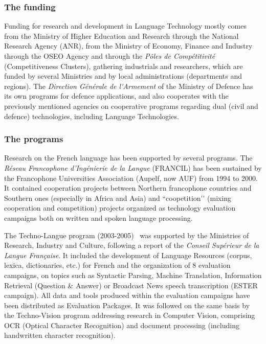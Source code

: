 \begin{multicols}{2}
\subsubsection{The funding}
Funding for research and development in Language Technology mostly
comes from the Ministry of Higher Education and Research through the
National Research Agency (ANR), from the Ministry of Economy, Finance
and Industry through the OSEO Agency and through the {\em Pôles de
Compétitivité} (Competitiveness Clusters), gathering industrials and
researchers, which are funded by several Ministries and by local
administrations (departments and regions). The {\em Direction Générale de
l{\mbox '}Armement} of the Ministry of Defence has its own programs for defence
applications, and also cooperates with the previously mentioned
agencies on cooperative programs regarding dual (civil and defence)
technologies, including Language Technologies.

\subsubsection{The programs}
Research on the French language has been supported by several
programs. The {\em Réseau Francophone d’Ingénierie de la Langue} (FRANCIL)
has been sustained by the Francophone Universities Association
(Aupelf, now AUF) from 1994 to 2000. It contained cooperation projects
between Northern francophone countries and Southern ones (especially
in Africa and Asia) and ``coopetition{\mbox '}{\mbox '} (mixing cooperation and
competition) projects organized as technology evaluation campaigns
both on written and spoken language processing.

The Techno-Langue program (2003-2005)~\cite{technolangue} was
supported by the Ministries of Research, Industry and Culture,
following a report of the {\em Conseil Supérieur de la Langue
  Française}. It included the development of Language Resources
(corpus, lexica, dictionaries, etc.) for French and the organization
of 8 evaluation campaigns, on topics such as Syntactic Parsing,
Machine Translation, Information Retrieval (Question \& Answer) or
Broadcast News speech transcription (ESTER campaign). All data and
tools produced within the evaluation campaigns have been distributed
as Evaluation Packages. It was followed on the same basis by the
Techno-Vision program addressing research in Computer Vision,
comprising OCR (Optical Character Recognition) and document processing
(including handwritten character recognition). 


\end{multicols}
